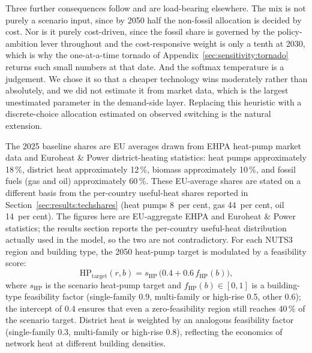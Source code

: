 Three further consequences follow and are load-bearing elsewhere. The mix is not purely a
scenario input, since by 2050 half the non-fossil allocation is decided by cost. Nor is
it purely cost-driven, since the fossil share is governed by the policy-ambition lever
throughout and the cost-responsive weight is only a tenth at 2030, which is why the
one-at-a-time tornado of Appendix~\ref{sec:sensitivity:tornado} returns such small
numbers at that date. And the softmax temperature is a judgement. We chose it so that a
cheaper technology wins moderately rather than absolutely, and we did not estimate it
from market data, which is the largest unestimated parameter in the demand-side layer.
Replacing this heuristic with a discrete-choice allocation estimated on observed
switching is the natural extension.

The 2025 baseline
shares are EU averages drawn from EHPA heat-pump market data and Euroheat \& Power
district-heating statistics: heat pumps approximately 18\,\%, district heat
approximately 12\,\%, biomass approximately 10\,\%, and fossil fuels (gas and
oil) approximately 60\,\%. These EU-average shares are stated on a different
basis from the per-country useful-heat shares reported in
Section~\ref{sec:results:techshares} (heat pumps 8~per cent, gas 44~per cent,
oil 14~per cent). The figures here are EU-aggregate EHPA and Euroheat \& Power statistics; the results section reports the per-country useful-heat
distribution actually used in the model, so the two are not contradictory.
For each NUTS3 region and building type, the 2050
heat-pump target is modulated by a feasibility score:
\begin{equation}
    \mathrm{HP_{target}}(r,b) = s_{\mathrm{HP}}\,\bigl(0.4 + 0.6\,f_{\mathrm{HP}}(b)\bigr),
    \label{eq:hpfeas}
\end{equation}
where $s_{\mathrm{HP}}$ is the scenario heat-pump target and
$f_{\mathrm{HP}}(b) \in [0,1]$ is a building-type feasibility factor
(single-family 0.9, multi-family or high-rise 0.5, other 0.6); the intercept of
0.4 ensures that even a zero-feasibility region still reaches 40\,\% of the
scenario target. District heat is weighted by an analogous feasibility factor
(single-family 0.3, multi-family or high-rise 0.8), reflecting the economics of
network heat at different building densities.

